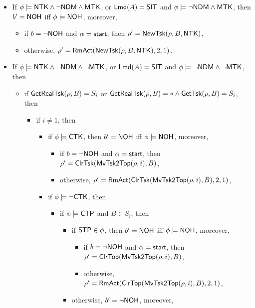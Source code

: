 \begin{itemize}
\item If $\phi \models {\sf NTK} \wedge \neg {\sf NDM}\wedge {\sf MTK}$, or ${\sf Lmd}(A) = {\sf SIT}$ and $\phi\models\neg{\sf NDM}\wedge{\sf MTK}$, then $b' = {\sf NOH}$ iff $\phi \models {\sf NOH}$, moreover, 
	\begin{itemize}
		\item if $b = \neg {\sf NOH}$ and $\alpha = {\mathsf{start} }$, then $\rho' = \mathsf{NewTsk}(\rho, B, {\sf NTK})$, 
		\item otherwise, $\rho' = \mathsf{RmAct}(\mathsf{NewTsk}(\rho, B, {\sf NTK}), 2, 1)$.
	\end{itemize}
%
\item If $\phi \models {\sf NTK} \wedge \neg {\sf NDM} \wedge \neg {\sf MTK}$, or ${\sf Lmd}(A) = {\sf SIT}$ and $\phi\models\neg{\sf NDM}\wedge\neg{\sf MTK}$, then
	\begin{itemize}
        \item if $\mathsf{GetRealTsk}(\rho, B) = S_i$ or $\mathsf{GetRealTsk}(\rho,B) = * \wedge\mathsf{GetTsk}(\rho,B) = S_i$, then
        \begin{itemize}
        \item if $i \neq 1$, then 
			\begin{itemize}
				\item if $\phi \models {\sf CTK}$, then $b' = {\sf NOH}$ iff $\phi \models {\sf NOH}$, moreover, 
                \begin{itemize}
					\item if $b = \neg {\sf NOH}$ and $\alpha = {\mathsf{start} }$, then $\rho'=\mathsf{ClrTsk}(\mathsf{MvTsk2Top}(\rho, i), B)$,
					\item otherwise, $\rho' = \mathsf{RmAct}(\mathsf{ClrTsk}(\mathsf{MvTsk2Top}(\rho, i), B), 2, 1)$, 
                \end{itemize}
				\item if $\phi \models \neg {\sf CTK}$, then
					\begin{itemize}
						\item if $\phi \models{\sf CTP}$ and $B \in S_i$, then 
						\begin{itemize}
							\item if ${\sf STP}\in\phi$, then $b' = {\sf NOH}$ iff $\phi \models {\sf NOH}$, moreover,
							\begin{itemize}
								\item if $b = \neg {\sf NOH}$ and $\alpha = {\mathsf{start} }$, then $\rho'=\mathsf{ClrTop}(\mathsf{MvTsk2Top}(\rho, i), B)$,
								\item otherwise, $\rho' = \mathsf{RmAct}(\mathsf{ClrTop}(\mathsf{MvTsk2Top}(\rho, i), B), 2, 1)$, 
							\end{itemize}
							\item otherwise, $b' = \neg{\sf NOH}$, moreover,

\end{itemize}
\end{itemize}
\end{itemize}
\end{itemize}
\end{itemize}
\end{itemize}
